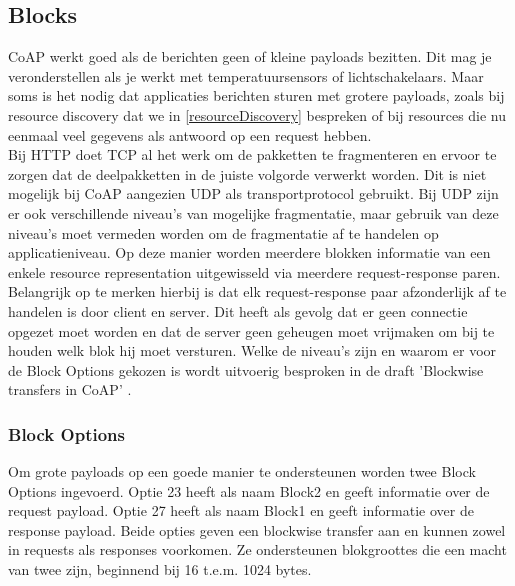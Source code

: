 \subsection{Blocks} \label{blocks}
CoAP werkt goed als de berichten geen of kleine payloads bezitten. Dit mag je veronderstellen als je werkt met temperatuursensors of lichtschakelaars. Maar soms is het nodig dat applicaties berichten sturen met grotere payloads, zoals bij resource discovery dat we in \ref{resourceDiscovery} bespreken of bij resources die nu eenmaal veel gegevens als antwoord op een request hebben.\\

Bij HTTP doet TCP al het werk om de pakketten te fragmenteren en ervoor te zorgen dat de deelpakketten in de juiste volgorde verwerkt worden. Dit is niet mogelijk bij CoAP aangezien UDP als transportprotocol gebruikt. Bij UDP zijn er ook verschillende niveau's van mogelijke fragmentatie, maar gebruik van deze niveau's moet vermeden worden om de fragmentatie af te handelen op applicatieniveau. Op deze manier worden meerdere blokken informatie van een enkele resource representation uitgewisseld via meerdere request-response paren. Belangrijk op te merken hierbij is dat elk request-response paar afzonderlijk af te handelen is door client en server. Dit heeft als gevolg dat er geen connectie opgezet moet worden en dat de server geen geheugen moet vrijmaken om bij te houden welk blok hij moet versturen. Welke de niveau's zijn en waarom er voor de Block Options gekozen is wordt uitvoerig besproken in de draft 'Blockwise transfers in CoAP' \cite{blockwiseTransfer}.

\subsubsection{Block Options}
Om grote payloads op een goede manier te ondersteunen worden twee Block Options ingevoerd. Optie 23 heeft als naam Block2 en geeft informatie over de request payload. Optie 27 heeft als naam Block1 en geeft informatie over de response payload. Beide opties  geven een blockwise transfer aan en kunnen zowel in requests als responses voorkomen. Ze ondersteunen blokgroottes die een macht van twee zijn, beginnend bij 16 t.e.m. 1024 bytes.

